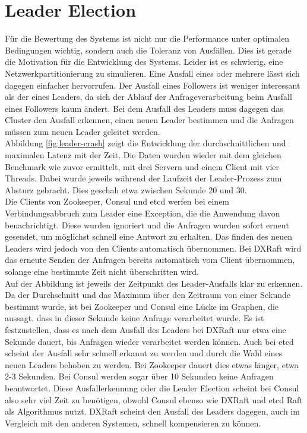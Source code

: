 \section{Leader Election}

Für die Bewertung des Systems ist nicht nur die Performance unter optimalen Bedingungen wichtig, sondern auch die Toleranz von Ausfällen. Dies ist gerade die Motivation für die Entwicklung des Systems. Leider ist es schwierig, eine Netzwerkpartitionierung zu simulieren. Eine Ausfall eines oder mehrere lässt sich dagegen einfacher hervorrufen. Der Ausfall eines Followers ist weniger interessant als der eines Leaders, da sich der Ablauf der Anfrageverarbeitung beim Ausfall eines Followers kaum ändert. Bei dem Ausfall des Leaders muss dagegen das Cluster den Ausfall erkennen, einen neuen Leader bestimmen und die Anfragen müssen zum neuen Leader geleitet werden. \\
Abbildung \ref{fig:leader-crash} zeigt die Entwicklung der durchschnittlichen und maximalen Latenz mit der Zeit. Die Daten wurden wieder mit dem gleichen Benchmark wie zuvor ermittelt, mit drei Servern und einem Client mit vier Threads. Dabei wurde jeweils während der Laufzeit der Leader-Prozess zum Absturz gebracht. Dies geschah etwa zwischen Sekunde 20 und 30. \\
Die Clients von Zookeeper, Consul und etcd werfen bei einem Verbindungsabbruch zum Leader eine Exception, die die Anwendung davon benachrichtigt. Diese wurden ignoriert und die Anfragen wurden sofort erneut gesendet, um möglichst schnell eine Antwort zu erhalten. Das finden des neuen Leaders wird jedoch von den Clients automatisch übernommen. Bei DXRaft wird das erneute Senden der Anfragen bereits automatisch vom Client übernommen, solange eine bestimmte Zeit nicht überschritten wird. \\
Auf der Abbildung ist jeweils der Zeitpunkt des Leader-Ausfalls klar zu erkennen. Da der Durchschnitt und das Maximum über den Zeitraum von einer Sekunde bestimmt wurde, ist bei Zookeeper und Consul eine Lücke im Graphen, die aussagt, dass in dieser Sekunde keine Anfrage verarbeitet wurde. Es ist festzustellen, dass es nach dem Ausfall des Leaders bei DXRaft nur etwa eine Sekunde dauert, bis Anfragen wieder verarbeitet werden können. Auch bei etcd scheint der Ausfall sehr schnell erkannt zu werden und durch die Wahl eines neuen Leaders behoben zu werden. Bei Zookeeper dauert dies etwas länger, etwa 2-3 Sekunden. Bei Consul werden sogar über 10 Sekunden keine Anfragen beantwortet. Diese Ausfallerkennung oder die Leader Election scheint bei Consul also sehr viel Zeit zu benötigen, obwohl Consul ebenso wie DXRaft und etcd Raft als Algorithmus nutzt. DXRaft scheint den Ausfall des Leaders dagegen, auch im Vergleich mit den anderen Systemen, schnell kompensieren zu können. \\
